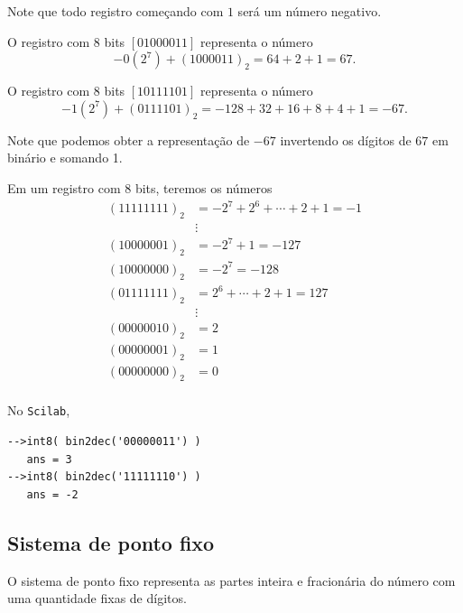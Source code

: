 \documentclass[main.tex]{subfiles}
\begin{document}
Note que todo registro começando com $1$ será um número negativo.

\begin{ex}
 O registro com $8$ bits $[01000011]$ representa o número
 $$-0(2^7)+(1000011)_2=64+2+1=67.$$

 O registro com $8$ bits $[10111101]$ representa o número
 $$-1(2^7)+(0111101)_2=-128+ 32+16+8+4+1=-67.$$

 Note que podemos obter a representação de $-67$ invertendo os dígitos de $67$ em binário e somando 1.
\end{ex}

\begin{ex}
Em um registro com $8$ bits, teremos os números
\begin{align*}
 (11111111)_2 &= -2^7+2^{6}+\cdots+2+1=-1\\
     &\vdots   \\
 (10000001)_2 &= -2^7+1 = -127 \\
 (10000000)_2 &= -2^7   = -128 \\
 (01111111)_2 &= 2^6+\cdots+2+1=127 \\
     &\vdots   \\
 (00000010)_2 &= 2 \\
 (00000001)_2 &= 1 \\
 (00000000)_2 &= 0 \\
\end{align*}
\end{ex}

\ifisscilab
\begin{ex}
  No \verb+Scilab+,
\begin{verbatim}
-->int8( bin2dec('00000011') )
   ans = 3
-->int8( bin2dec('11111110') )
   ans = -2
\end{verbatim}
\end{ex}
\fi


\subsection{Sistema de ponto fixo}

O sistema de ponto fixo representa as partes inteira e fracionária do número com uma quantidade fixas de dígitos.
\end{document}
